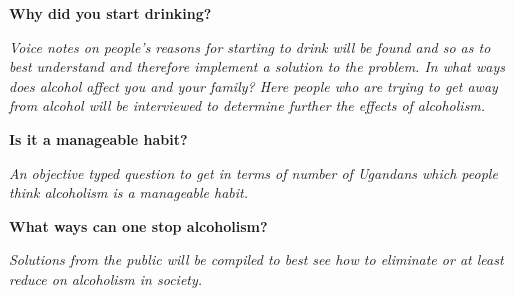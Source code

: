 \documentclass[11pt]{article}
\begin{document}
\textbf{Why did you start drinking?}

\textit{Voice notes on people’s reasons for starting to drink will be found and so as to best understand and therefore implement a solution to the problem.
In what ways does alcohol affect you and your family?
Here people who are trying to get away from alcohol will be interviewed to determine further the effects of alcoholism.}


\textbf{Is it a manageable habit?}

\textit{An objective typed question to get in terms of number of Ugandans which people think alcoholism is a manageable habit.}


\textbf{What ways can one stop alcoholism?}

\textit{Solutions from the public will be compiled to best see how to eliminate or at least reduce on alcoholism in society.}
\end{document}
